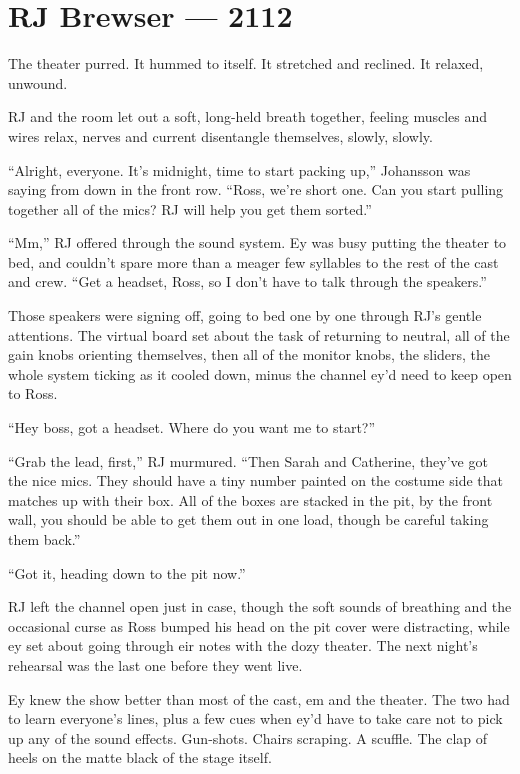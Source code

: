 \chapter*{RJ Brewser — 2112}

The theater purred. It hummed to itself. It stretched and reclined. It relaxed, unwound.

RJ and the room let out a soft, long-held breath together, feeling muscles and wires relax, nerves and current disentangle themselves, slowly, slowly.

``Alright, everyone. It's midnight, time to start packing up,'' Johansson was saying from down in the front row. ``Ross, we're short one. Can you start pulling together all of the mics? RJ will help you get them sorted.''

``Mm,'' RJ offered through the sound system. Ey was busy putting the theater to bed, and couldn't spare more than a meager few syllables to the rest of the cast and crew. ``Get a headset, Ross, so I don't have to talk through the speakers.''

Those speakers were signing off, going to bed one by one through RJ's gentle attentions. The virtual board set about the task of returning to neutral, all of the gain knobs orienting themselves, then all of the monitor knobs, the sliders, the whole system ticking as it cooled down, minus the channel ey'd need to keep open to Ross.

``Hey boss, got a headset. Where do you want me to start?''

``Grab the lead, first,'' RJ murmured. ``Then Sarah and Catherine, they've got the nice mics. They should have a tiny number painted on the costume side that matches up with their box. All of the boxes are stacked in the pit, by the front wall, you should be able to get them out in one load, though be careful taking them back.''

``Got it, heading down to the pit now.''

RJ left the channel open just in case, though the soft sounds of breathing and the occasional curse as Ross bumped his head on the pit cover were distracting, while ey set about going through eir notes with the dozy theater. The next night's rehearsal was the last one before they went live.

Ey knew the show better than most of the cast, em and the theater. The two had to learn everyone's lines, plus a few cues when ey'd have to take care not to pick up any of the sound effects. Gun-shots. Chairs scraping. A scuffle. The clap of heels on the matte black of the stage itself.

